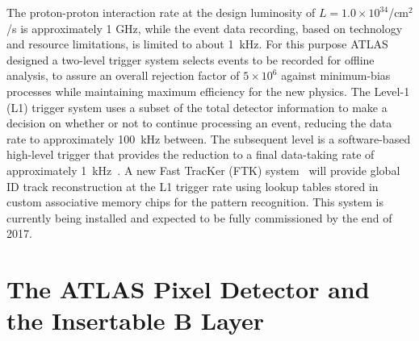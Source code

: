 The proton-proton interaction rate at the design luminosity of $L=1.0\times10^{34}$/cm$^{2}$/s 
is approximately 1 GHz, while the event data recording, based on technology and resource limitations, 
is limited to about 1~kHz. For this purpose ATLAS designed 
a  two-level trigger system selects events to be recorded for offline analysis, to assure 
an overall rejection factor of $5\times10^{6}$ against minimum-bias processes while maintaining 
maximum efficiency for the new physics. 
The Level-1 (L1) trigger system uses a subset of the total detector information to make a decision on 
whether or not to continue processing an event, reducing the data rate to approximately 100~kHz between. 
The subsequent  level is a software-based high-level trigger that 
 provides 
the reduction to a final data-taking rate of approximately 1~kHz~\cite{AtlasTrigger2015}. A new Fast TracKer (FTK) system~\cite{FTKTDR} will 
provide global ID track reconstruction at the L1 trigger rate
using lookup tables stored in custom associative memory chips for the pattern recognition.  This 
system is currently being installed and expected to
be fully commissioned by the end of 2017.



\section{The ATLAS Pixel Detector and the Insertable B Layer}
\label{sec:ATLASPixelDetector}

